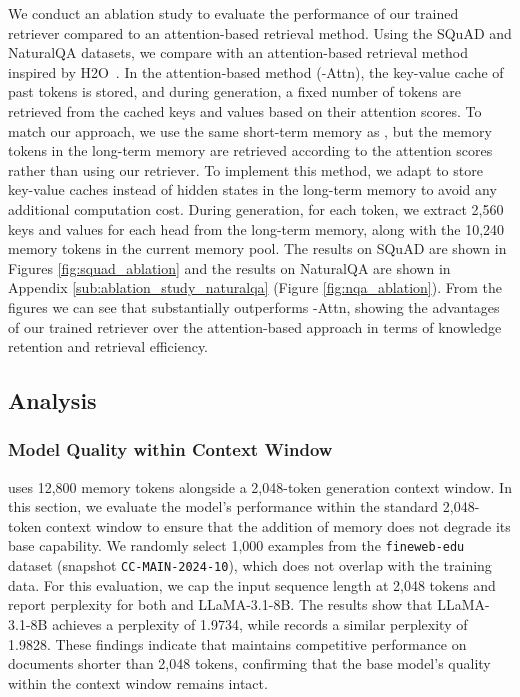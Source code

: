We conduct an ablation study to evaluate the performance of our trained retriever compared to an attention-based retrieval method. Using the SQuAD and NaturalQA datasets, we compare \ours with an attention-based retrieval method inspired by H2O~\citep{h2o}. In the attention-based method (\ours-Attn), the key-value cache of past tokens is stored, and during generation, a fixed number of tokens are retrieved from the cached keys and values based on their attention scores. To match our approach, we use the same short-term memory as \ours, but the memory tokens in the long-term memory are retrieved according to the attention scores rather than using our retriever. To implement this method, we adapt \ours to store key-value caches instead of hidden states in the long-term memory to avoid any additional computation cost. During generation, for each token, we extract 2,560 keys and values for each head from the long-term memory, along with the 10,240 memory tokens in the current memory pool. The results on SQuAD are shown in  Figures \ref{fig:squad_ablation} and the results on NaturalQA are shown in Appendix \ref{sub:ablation_study_naturalqa} (Figure \ref{fig:nqa_ablation}). From the figures we can see that \ours substantially outperforms \ours-Attn, showing the advantages of our trained retriever over the attention-based approach in terms of knowledge retention and retrieval efficiency. 


\vspace{-5pt}
\subsection{Analysis}

\subsubsection{Model Quality within Context Window}
\ours uses 12,800 memory tokens alongside a 2,048-token generation context window. In this section, we evaluate the model's performance within the standard 2,048-token context window to ensure that the addition of memory does not degrade its base capability. We randomly select 1,000 examples from the \texttt{fineweb-edu} dataset (snapshot \texttt{CC-MAIN-2024-10}), which does not overlap with the training data. For this evaluation, we cap the input sequence length at 2,048 tokens and report perplexity for both \ours and LLaMA-3.1-8B. The results show that LLaMA-3.1-8B achieves a perplexity of 1.9734, while \ours records a similar perplexity of 1.9828. These findings indicate that \ours maintains competitive performance on documents shorter than 2,048 tokens, confirming that the base model’s quality within the context window remains intact.

